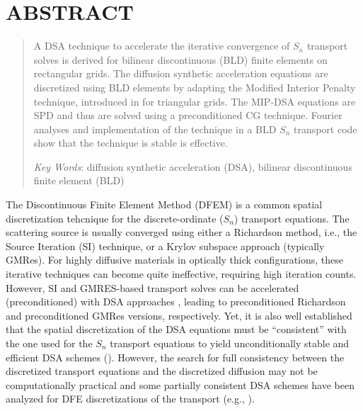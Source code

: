 \documentclass{mc2013}
\renewcommand{\(}{\left(}
\renewcommand{\)}{\right)}
\renewcommand{\[}{\left[}
\renewcommand{\]}{\right]}
\newcommand{\sn}{\ensuremath{S_n}\xspace}
\begin{document}
\section*{ABSTRACT} 
\begin{quote}
\begin{small}
A DSA technique to accelerate the iterative convergence of \sn transport solves is derived for bilinear discontinuous (BLD) finite elements on rectangular grids.
The diffusion synthetic acceleration equations are discretized using BLD elements by adapting the Modified Interior Penalty technique, introduced 
in \cite{mip} for triangular grids. The MIP-DSA equations are SPD and thus are solved using a preconditioned CG technique. Fourier analyses and implementation of the technique in a BLD \sn transport code show that the technique is stable is effective. 

\emph{Key Words}: diffusion synthetic acceleration (DSA), bilinear discontinuous finite element (BLD)
\end{small} 
\end{quote}

\setlength{\baselineskip}{14pt}
\normalsize


The Discontinuous Finite Element Method (DFEM) is a common spatial discretization tehcnique for 
the discrete-ordinate (\sn) transport equations. 
The scattering source is usually converged using either a Richardson method, i.e., the Source Iteration (SI) technique,
or a Krylov subspace approach (typically GMRes). 
For highly diffusive materials in optically thick configurations, these iterative techniques 
can become quite ineffective, requiring high iteration counts.
However, SI and GMRES-based transport solves 
can be accelerated (preconditioned) with DSA approaches \cite{dsa_ref},
leading to preconditioned Richardson and preconditioned GMRes versions, respectively.
%
Yet, it is also well established that the spatial discretization of the DSA equations
must be ``consistent'' with the one used for the \sn transport equations to
yield unconditionally stable and efficient DSA schemes
(\cite{dsa_ref,larsen_dsa,consistent_p1,wla,mip}). However, the search for full
consistency between the discretized transport equations and the discretized
diffusion may not be computationally practical \cite{consistent_p1} and 
some partially consistent DSA schemes have been analyzed for DFE discretizations 
of the transport (e.g., \cite{wla,mip}).
\end{document}
